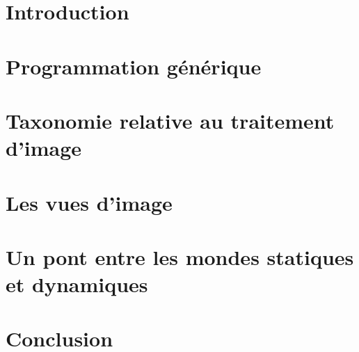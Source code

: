 \section*{Introduction}

\section*{Programmation générique}

\section*{Taxonomie relative au traitement d'image}

\section*{Les vues d'image}

\section*{Un pont entre les mondes statiques et dynamiques}

\section*{Conclusion}
